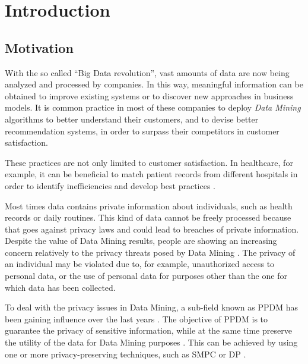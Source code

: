 %

\acresetall

\chapter{Introduction}
\label{ch:Introduction}


\section{Motivation}
\label{sec:Intro_Motivation}

With the so called ``Big Data revolution'', vast amounts of data are now being analyzed and processed by companies. In this way, meaningful information can be obtained to improve existing systems or to discover new approaches in business models. It is common practice in most of these companies to deploy \textit{Data Mining} algorithms to better understand their customers, and to devise better recommendation systems, in order to surpass their competitors in customer satisfaction.

These practices are not only limited to customer satisfaction. In healthcare, for example, it can be beneficial to match patient records from different hospitals in order to identify inefficiencies and develop best practices \cite{Lu2014}.

Most times data contains private information about individuals, such as health records or daily routines. This kind of data cannot be freely processed because that goes against privacy laws and could lead to breaches of private information.
Despite the value of Data Mining results, people are showing an increasing concern relatively to the privacy threats posed by Data Mining \cite{brankovic1999privacy}. The privacy of an individual may be violated due to, for example, unauthorized access to personal data, or the use of personal data for purposes other than the one for which data has been collected.

To deal with the privacy issues in Data Mining, a sub-field known as \ac{PPDM} has been gaining influence over the last years \cite{DAcquisto2015}. The objective of PPDM is to guarantee the privacy of sensitive information, while at the same time preserve the utility of the data for Data Mining purposes \cite{agrawal2000privacy}.
This can be achieved by using one or more privacy-preserving techniques, such as \ac{SMPC} \cite{DAcquisto2015} or \ac{DP} \cite{Danezis2015}.


